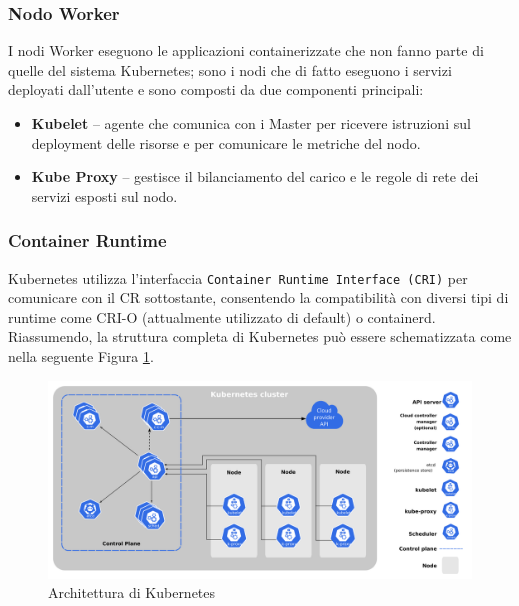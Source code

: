 \subsubsection{Nodo Worker}
I nodi Worker eseguono le applicazioni containerizzate che non fanno parte di quelle del sistema Kubernetes; sono i nodi che di fatto eseguono i servizi deployati dall'utente e sono composti da due componenti principali:
\begin{itemize}
\item \textbf{Kubelet} -- agente che comunica con i Master per ricevere istruzioni sul deployment delle risorse e per comunicare le metriche del nodo.
\item \textbf{Kube Proxy} -- gestisce il bilanciamento del carico e le regole di rete dei servizi esposti sul nodo.
\end{itemize}

\subsubsection{Container Runtime}

Kubernetes utilizza l'interfaccia \texttt{Container Runtime Interface (CRI)} per comunicare con il CR sottostante, consentendo la compatibilità con diversi tipi di runtime come CRI-O (attualmente utilizzato di default) o containerd.\\

Riassumendo, la struttura completa di Kubernetes può essere schematizzata come nella seguente Figura \ref{fig:kube_arch}.
\FloatBarrier
\begin{figure}[h]
    \centering
    \includegraphics[width=\textwidth]{img/components-of-kubernetes.png}
    \caption{Architettura di Kubernetes \protect\footnotemark}
    \label{fig:kube_arch}
\end{figure}
\FloatBarrier
{}

